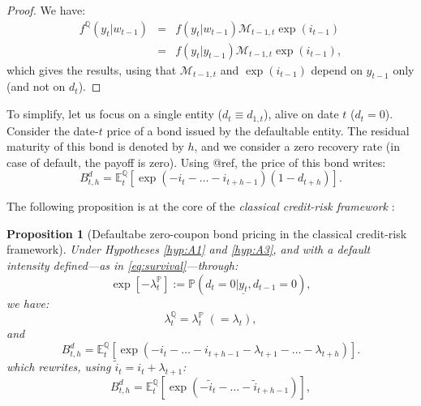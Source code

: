 \documentclass[
  12pt,
]{book}
\newtheorem{proposition}{Proposition}[chapter]
\theoremstyle{definition}
\theoremstyle{definition}
\theoremstyle{definition}
\theoremstyle{definition}
\theoremstyle{remark}
\begin{document}
\begin{proof}
We have:
\begin{eqnarray}
f^{\mathbb{Q}}(y_t|w_{t-1}) &=& f(y_t|w_{t-1})\mathcal{M}_{t-1,t}\exp(i_{t-1})\\
&=& f(y_t|y_{t-1})\mathcal{M}_{t-1,t}\exp(i_{t-1}),
\end{eqnarray}
which gives the results, using that \(\mathcal{M}_{t-1,t}\) and \(\exp(i_{t-1})\) depend on \(y_{t-1}\) only (and not on \(d_t\)).
\end{proof}

To simplify, let us focus on a single entity (\(d_t \equiv d_{1,t}\)), alive on date \(t\) (\(d_t=0\)). Consider the date-\(t\) price of a bond issued by the defaultable entity. The residual maturity of this bond is denoted by \(h\), and we consider a zero recovery rate (in case of default, the payoff is zero). Using @ref\label{eq:basic}, the price of this bond writes:
\[
B^d_{t,h} = \mathbb{E}_t^{\mathbb{Q}}[\exp(-i_t-\dots-i_{t+h-1})(1-d_{t+h})].
\]

The following proposition is at the core of the \emph{classical credit-risk framework} \citep{Duffie_Singleton_1999}:

\begin{proposition}[Defaultabe zero-coupon bond pricing in the classical credit-risk framework]
\protect\hypertarget{prp:defaultBondclassical}{}\label{prp:defaultBondclassical}Under Hypotheses \ref{hyp:A1} and \ref{hyp:A3}, and with a default intensity defined---as in \eqref{eq:survival}---through:
\begin{equation}
\exp[-\lambda_t^{\mathbb{P}}]:=\mathbb{P} ( d_t=0  |  \underline{y_{t}}, d_{t-1}=0 ),
\end{equation}
we have:
\begin{equation}
\lambda_t^{\mathbb{Q}} = \lambda_t^{\mathbb{P}}\;(=\lambda_t),\label{eq:lambdaPQ}
\end{equation}
and
\begin{equation}
\boxed{B_{t,h}^d = \mathbb{E}_t^{\mathbb{Q}}\left[\exp\left(-i_t-\dots-i_{t+h-1}- \lambda_{t+1} - \dots - \lambda_{t+h}\right)\right].}\label{eq:standardPriceCredit2}
\end{equation}
which rewrites, using \(\tilde{i}_t = i_t + \lambda_{t+1}\):
\begin{equation}
B_{t,h}^d = \mathbb{E}_t^{\mathbb{Q}}\left[\exp\left(-\tilde{i}_t-\dots-\tilde{i}_{t+h-1}\right)\right],\label{eq:standardPriceCredit3}
\end{equation}
\end{proposition}
\end{document}

